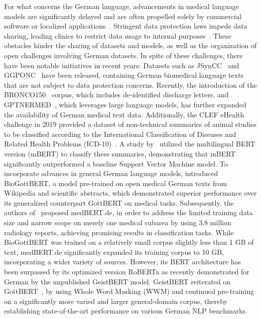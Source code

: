 For what concerns the German language, advancements in medical language models
are significantly delayed and are often propelled solely by commercial software
or localized applications~\cite{starlinger2017improve}. Stringent data
protection laws impede data sharing, leading clinics to restrict data usage to
internal purposes~\cite{hellrich2015sharing}. These obstacles hinder the sharing
of datasets and models, as well as the organization of open challenges involving
German datasets. In spite of these challenges, there have been notable
initiatives in recent years: Datasets such as JSynCC~\cite{lohr2018sharing} and
GGPONC~\cite{borchert2022ggponc} have been released, containing German
biomedical language texts that are not subject to data protection concerns.
Recently, the introduction of the BRONCO150~\cite{kittner2021bronco150} corpus,
which includes de-identified discharge letters, and
GPTNERMED~\cite{frei2023gptnermed}, which leverages large language models, has
further expanded the availability of German medical text data. Additionally, the
CLEF eHealth challenge in 2019 provided a dataset of non-technical summaries of
animal studies to be classified according to the International Classification of
Diseases and Related Health Problems (ICD-10)~\cite{clef2019nts, clef2019test,
world1992icd}. A study by~\cite{sanger2019classifying} utilized the multilingual
BERT version (mBERT) to classify these summaries, demonstrating that mBERT
significantly outperformed a baseline Support Vector Machine model. To
incorporate advances in general German language models,
\cite{lentzen2022critical} introduced BioGottBERT, a model pre-trained on open
medical German texts from Wikipedia and scientific abstracts, which demonstrated
superior performance over its generalized counterpart GottBERT on medical tasks.
Subsequently, the authors of~\cite{bressem2024medbert} proposed medBERT.de, in
order to address the limited training data size and narrow scope on merely one
medical subarea by using 3.8 million radiology reports, achieving promising
results in classification tasks. While BioGottBERT was trained on a relatively
small corpus slightly less than 1 GB of text, medBERT.de significantly expanded
its training corpus to 10 GB, incorporating a wider variety of sources. However,
its BERT architecture has been surpassed by its optimized version RoBERTa as
recently demonstrated for German by the unpublished GeistBERT model. GeistBERT
reiterated on GottBERT~\cite{scheible2020gottbert}, by using Whole Word Masking
(WWM) and continued pre-training on a significantly more varied and larger
general-domain corpus, thereby establishing state-of-the-art performance on
various German NLP benchmarks.

